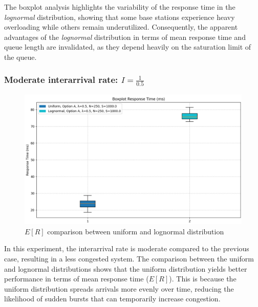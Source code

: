 \documentclass{report}
\begin{document}
\begin{flushleft}
The boxplot analysis highlights the variability of the response time in the \emph{lognormal} distribution, showing that some base stations experience heavy overloading while others remain underutilized. Consequently, the apparent advantages of the \emph{lognormal} distribution in terms of mean response time and queue length are invalidated, as they depend heavily on the saturation limit of the queue.

\end{flushleft}

\vspace{10mm}

\subsubsection*{Moderate interarrival rate: $I = \frac{1}{0.5}$} 

\begin{figure}[H] 
    \centering 
    \includegraphics[width=\textwidth]{img/plots/I-vary/R_Box_A_I05.png} \caption{$E[R]$ comparison between uniform and lognormal distribution}
\end{figure}

In this experiment, the interarrival rate is moderate compared to the previous case, resulting in a less congested system. The comparison between the uniform and lognormal distributions shows that the uniform distribution yields better performance in terms of mean response time ($E[R]$). This is because the uniform distribution spreads arrivals more evenly over time, reducing the likelihood of sudden bursts that can temporarily increase congestion.
\end{document}
